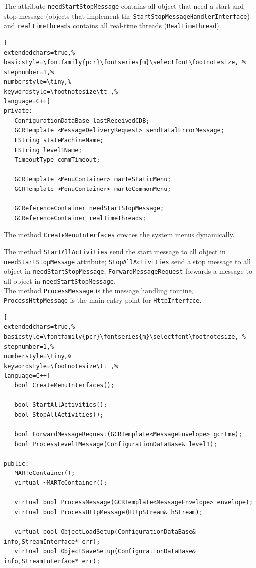 The attribute \texttt{needStartStopMessage} contains all object that need a start and stop message (objects that implement the \texttt{StartStopMessageHandlerInterface}) and \texttt{realTimeThreads} contains all real-time threads (\texttt{RealTimeThread}).

\begin{lstlisting}[
extendedchars=true,%
basicstyle=\fontfamily{pcr}\fontseries{m}\selectfont\footnotesize, %
stepnumber=1,%
numberstyle=\tiny,%
keywordstyle=\footnotesize\tt ,%
language=C++]
private:
   ConfigurationDataBase lastReceivedCDB;
   GCRTemplate <MessageDeliveryRequest> sendFatalErrorMessage;
   FString stateMachineName;
   FString level1Name;
   TimeoutType commTimeout;

   GCRTemplate <MenuContainer> marteStaticMenu;
   GCRTemplate <MenuContainer> marteCommonMenu;

   GCReferenceContainer needStartStopMessage;
   GCReferenceContainer realTimeThreads;
\end{lstlisting}

The method \texttt{CreateMenuInterfaces} creates the system menus dynamically.

The method \texttt{StartAllActivities} send the start message to all object in \texttt{needStartStopMessage} attribute; \texttt{StopAllActivities} send a stop message to all object in \texttt{needStartStopMessage};  \texttt{ForwardMessageRequest} forwards a message to all object in \texttt{needStartStopMessage}. \\


The method \texttt{ProcessMessage} is the message handling routine, \texttt{ProcessHttpMessage} is the main entry point for \texttt{HttpInterface}.

\begin{lstlisting}[
extendedchars=true,%
basicstyle=\fontfamily{pcr}\fontseries{m}\selectfont\footnotesize, %
stepnumber=1,%
numberstyle=\tiny,%
keywordstyle=\footnotesize\tt ,%
language=C++]
   bool CreateMenuInterfaces();

   bool StartAllActivities();
   bool StopAllActivities();

   bool ForwardMessageRequest(GCRTemplate<MessageEnvelope> gcrtme);
   bool ProcessLevel1Message(ConfigurationDataBase& level1);

public:
   MARTeContainer();
   virtual ~MARTeContainer();

   virtual bool ProcessMessage(GCRTemplate<MessageEnvelope> envelope);
   virtual bool ProcessHttpMessage(HttpStream& hStream);

   virtual bool ObjectLoadSetup(ConfigurationDataBase& info,StreamInterface* err);
   virtual bool ObjectSaveSetup(ConfigurationDataBase& info,StreamInterface* err);
\end{lstlisting}



